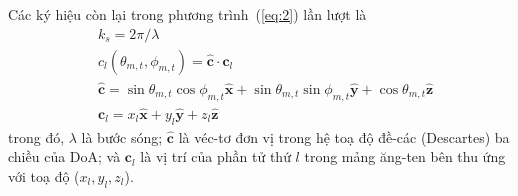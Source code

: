 Các ký hiệu còn lại trong phương trình~(\ref{eq:2}) lần lượt là
\begin{equation}
    \begin{aligned}
        &k_s = 2\pi/\lambda \\
        &c_l(\theta_{m, t}, \phi_{m, t}) = \widehat{\boldsymbol{c}} \cdot \boldsymbol{c}_l \\
        &\widehat{\boldsymbol{c}}=\sin \theta_{m, t} \cos \phi_{m, t} \widehat{\boldsymbol{x}}+\sin \theta_{m, t} \sin \phi_{m, t} \widehat{\boldsymbol{y}}+\cos \theta_{m, t} \widehat{\boldsymbol{z}} \\
        &\boldsymbol{c}_l=x_{l} \widehat{\boldsymbol{x}}+y_{l} \widehat{\boldsymbol{y}}+z_{l} \hat{\boldsymbol{z}}
    \end{aligned}
\end{equation}
trong đó, $\lambda$ là bước sóng; $\widehat{\boldsymbol{c}}$ là véc-tơ đơn vị trong hệ toạ độ đề-các (Descartes) ba chiều của DoA; và $\boldsymbol{c}_l$ là vị trí của phần tử thứ $l$ trong mảng ăng-ten bên thu ứng với toạ độ ($x_l, y_l, z_l$).
